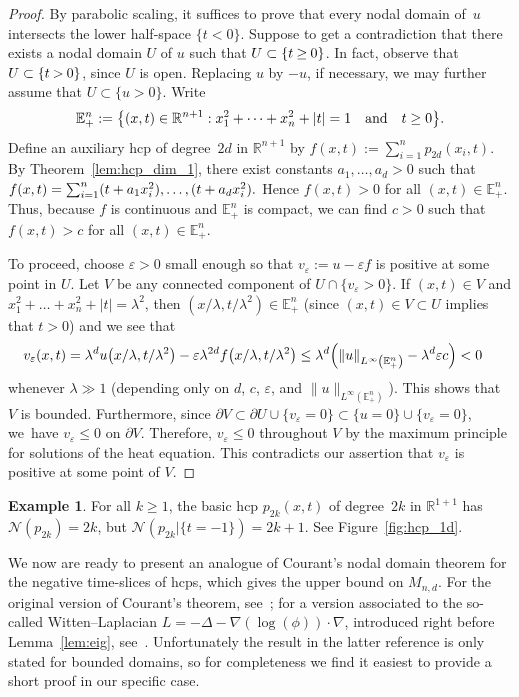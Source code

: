 \documentclass[10pt]{amsart}
\theoremstyle{definition}\newtheorem{defi}[theo]{Definition}\newtheorem{rema}[theo]{Remark}\newtheorem{exam}[theo]{Example}\newtheorem{exem}[theo]{Example}\newtheorem{nota}[theo]{Notation}
\newcommand{\R}{\mathbb{R}}
\newcommand{\bbE}{\mathbb{E}}
\newcommand{\norm}[1]{\left \lVert #1 \right \rVert}
\newcommand{\nodal}{\mathcal{N}}
\renewcommand{\epsilon}{\varepsilon}
\newcommand*{\mk}{\mkern -1mu}
\let\originalleft\left
\let\originalright\right
\renewcommand{\left}{\mathopen{}\mathclose\bgroup\originalleft}
\renewcommand{\right}{\aftergroup\egroup\originalright}
\begin{document}
\begin{proof}
By parabolic scaling, it suffices to prove that every nodal domain of~$u$ intersects the lower half-space $\{t<0\}$. Suppose to get a contradiction that there exists a nodal domain $U$ of $u$ such that $U\subset\{t\mk\geq\mk 0\}$. In fact, observe that ${U\subset\{t\mk>\mk0\}}$, since $U$ is open. Replacing $u$ by $-u$, if necessary, we may further assume that $U\subset\{u>0\}$. Write
\[
\bbE^n_+:=\left\{(x,t)\in\R^{n+1}:x_1^2+\dots+x_n^2+|t|=1\quad \text{and}\quad t\geq 0\right\}.
\]
Define an auxiliary hcp of degree~$2d$ in $\R^{n+1}$ by $f(x,t):=\sum_{i=1}^n p_{2d}(x_i,t)$. By Theorem~\ref{lem:hcp_dim_1}, there exist constants $a_1,\dots,a_d>0$ such that $f(x,t)=\sum_{i=1}^n (t+a_1x_i^2),\dots,\linebreak (t+a_dx_i^2).$ Hence $f(x,t)>0$ for all $(x,t)\in \bbE^n_+$. Thus, because $f$ is continuous and $\bbE^n_+$ is compact, we can find $c>0$ such that $f(x,t)>c$ for all $(x,t)\in \bbE^n_+$.

To proceed, choose $\epsilon>0$ small enough so that $v_\epsilon := u - \epsilon f$ is positive at some point in $U$. Let $V$ be any connected component of $U\cap\{v_\epsilon>0\}$. If $(x,t)\in V$ and $x_1^2+\dots+x_n^2+|t|=\lambda^2$, then $(x/\lambda,t/\lambda^2)\in \bbE^n_+$ {(since $(x,t) \in V \subset U$ implies that $t > 0$)} and we see that
\begin{align*}
v_\epsilon(x,t) & = \lambda^d u\left(x/\lambda, t/\lambda^2\right) - \epsilon \lambda^{2d} f\left(x/\lambda, t/\lambda^2\right) \le \lambda^d\left(\norm{u}_{L^\infty\left(\bbE^n_+\right)} - \lambda^{d} \epsilon c\right) < 0
\end{align*}
whenever $\lambda\gg 1$ (depending only on $d$, $c$, $\epsilon$, and $\|u\|_{L^\infty(\bbE^n_+)}$). This shows that $V$ is bounded. Furthermore, since $\partial V\subset \partial U\cup \{v_\epsilon=0\}\subset\{u=0\}\cup\{v_\epsilon=0\}$, we~have $v_\epsilon\leq 0$ on $\partial V$. Therefore, $v_\epsilon\leq 0$ throughout $V$ by the maximum principle for solutions of the heat equation. This contradicts our assertion that $v_\epsilon$ is positive at some point of $V$.
\end{proof}

\begin{exam}
For all $k\geq 1$, the basic hcp $p_{2k}(x,t)$ of degree~$2k$ in $\R^{1+1}$ has $\nodal(p_{2k})=2k$, but $\nodal(p_{2k}|\{t=-1\})=2k+1$. See Figure~\ref{fig:hcp_1d}.
\end{exam}


We now are ready to present an analogue of Courant's nodal domain theorem for the negative time-slices of hcps, which gives the upper bound on $M_{n,d}$. For the original version of Courant's theorem, see~\cite[Chapter~VI, Section~6]{CH}; {for a version associated to the so-called Witten--Laplacian $L = -\Delta - \nabla(\log(\phi)) \cdot \nabla$, introduced right before Lemma~\ref{lem:eig}, see~\cite{CM25}. Unfortunately the result in the latter reference is only stated for bounded domains, so for completeness we find it easiest to provide a short proof in our specific case.}
\end{document}
